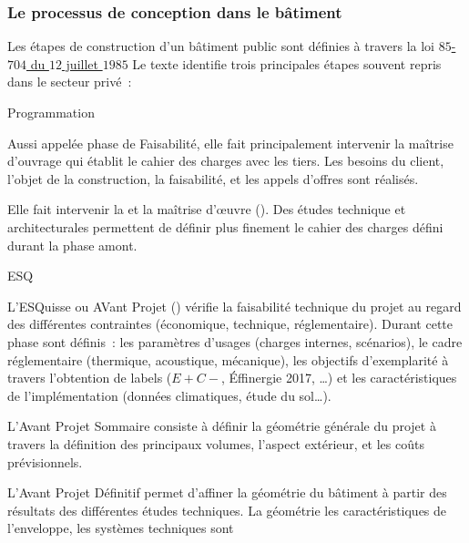\subsubsection{Le processus de conception dans le bâtiment} %
\label{ssub:le_processus_de_conception_dans_le_batiment}
Les étapes de construction d’un bâtiment public sont définies à travers la loi
\href{https://www.legifrance.gouv.fr/affichTexte.do?cidTexte=JORFTEXT000000693683}{$85$-$704$ du $12$ juillet $1985$}
Le texte identifie trois principales étapes souvent repris dans le secteur privé~:
\begin{blockdescription}{Programmation}
    \item[Programmation] Aussi appelée phase de Faisabilité, elle fait principalement intervenir la
          maîtrise d’ouvrage qui établit le cahier des charges avec les tiers. Les besoins
          du client, l’objet de la construction, la faisabilité, et les appels d’offres
          sont réalisés.
    \item[Conception] Elle fait intervenir la  et la maîtrise d’œuvre ().
          Des études technique et architecturales permettent de définir plus finement le cahier des charges
          défini durant la phase amont.
          \begin{blockdescription}{ESQ}
              \item [\abr{ESQ}] L’ESQuisse ou AVant Projet () vérifie la faisabilité technique du projet au regard
                    des différentes contraintes (économique, technique, réglementaire). Durant cette
                    phase sont définis~: les paramètres d’usages
                    (charges internes, scénarios), le cadre réglementaire (thermique, acoustique, mécanique),
                    les objectifs d’exemplarité à travers l’obtention de labels ($E+C-$,
                     Éffinergie 2017, \dots) et les caractéristiques de l’implémentation
                    (données climatiques, étude du sol\dots).
              \item [\abr{APS}] L’Avant Projet Sommaire consiste à définir la géométrie générale
                    du projet à travers la définition des principaux volumes, l’aspect extérieur,
                    et les coûts prévisionnels.
              \item [\abr{APD}] L’Avant Projet Définitif permet d’affiner la géométrie du bâtiment
                    à partir des résultats des différentes études techniques. La géométrie
                    les caractéristiques de l’enveloppe, les systèmes techniques sont

\end{blockdescription}
\end{blockdescription}
